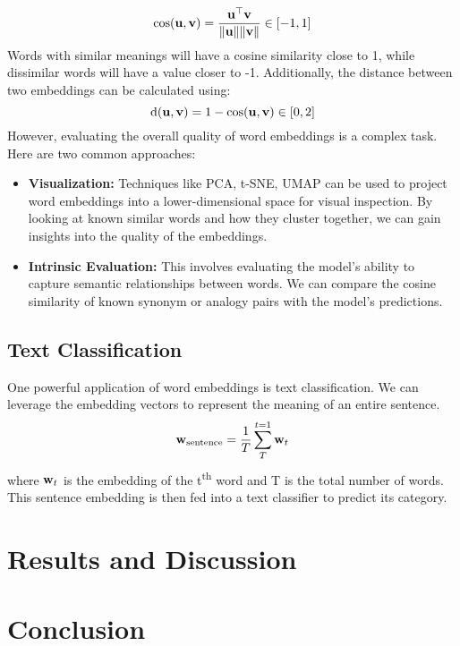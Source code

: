 \begin{equation}
	\cos(\mathbf{u}, \mathbf{v}) =\frac{\mathbf{u}^\top \mathbf{v}}{\|\mathbf{u}\|\|\mathbf{v}\|}\in [-1,1]
\end{equation}
Words with similar meanings will have a cosine similarity close to 1, while dissimilar words will have a value closer to -1. Additionally, the distance between two embeddings can be calculated using:
\begin{equation}
	\mathrm{d}(\mathbf{u}, \mathbf{v}) =1 -\cos(\mathbf{u}, \mathbf{v})\in [0,2]
\end{equation}
However, evaluating the overall quality of word embeddings is a complex task. Here are two common approaches:
\begin{itemize}
	\item \textbf{Visualization:} Techniques like PCA, t-SNE, UMAP can be used to project word embeddings into a lower-dimensional space for visual inspection. By looking at known similar words and how they cluster together, we can gain insights into the quality of the embeddings.
	\item \textbf{Intrinsic Evaluation:} This involves evaluating the model's ability to capture semantic relationships between words. We can compare the cosine similarity of known synonym or analogy pairs with the model's predictions.
\end{itemize}



\subsection{Text Classification}
One powerful application of word embeddings is text classification. We can leverage the embedding vectors to represent the meaning of an entire sentence.
\begin{equation}
	\mathbf{w}_{\mathrm{sentence}} = \frac{1}{T}\sum_{T}^{t=1}\mathbf{w}_t
\end{equation}
where $\mathbf{w}_t$ is the embedding of the t\textsuperscript{th} word and T is the total number of words.
This sentence embedding is then fed into a text classifier to predict its category. 
\section{Results and Discussion}
\section{Conclusion}

